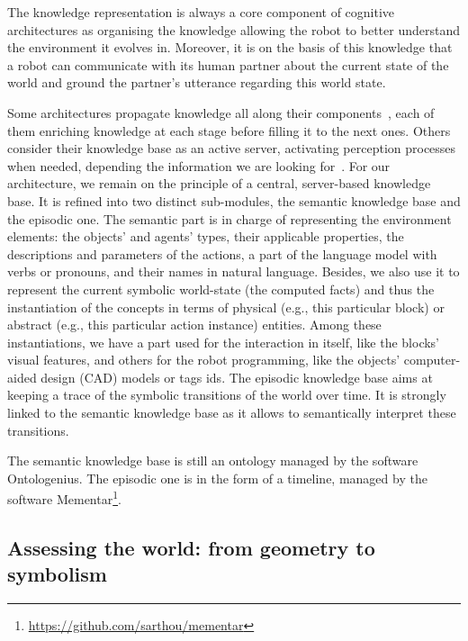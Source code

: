 The knowledge representation is always a core component of cognitive architectures as organising the knowledge allowing the robot to better understand the environment it evolves in. Moreover, it is on the basis of this knowledge that a robot can communicate with its human partner about the current state of the world and ground the partner's utterance regarding this world state.

Some architectures propagate knowledge all along their components~\cite{hawes_2007_balt}, each of them enriching knowledge at each stage before filling it to the next ones. Others consider their knowledge base as an active server, activating perception processes when needed, depending the information we are looking for~\cite{beetz_2018_know}. For our architecture, we remain on the principle of a central, server-based knowledge base. It is refined into two distinct sub-modules, the semantic knowledge base and the episodic one. The semantic part is in charge of representing the environment elements: the objects' and agents' types, their applicable properties, the descriptions and parameters of the actions, a part of the language model with verbs or pronouns, and their names in natural language. Besides, we also use it to represent the current symbolic world-state (the computed facts) and thus the instantiation of the concepts in terms of physical (e.g., this particular block) or abstract (e.g., this particular action instance) entities. Among these instantiations, we have a part used for the interaction in itself, like the blocks' visual features, and others for the robot programming, like the objects' computer-aided design (CAD) models or tags ids. The episodic knowledge base aims at keeping a trace of the symbolic transitions of the world over time. It is strongly linked to the semantic knowledge base as it allows to semantically interpret these transitions. 

The semantic knowledge base is still an ontology managed by the software Ontologenius. The episodic one is in the form of a timeline, managed by the software Mementar\footnote{\url{https://github.com/sarthou/mementar}}.

\subsection{Assessing the world: from geometry to symbolism}


